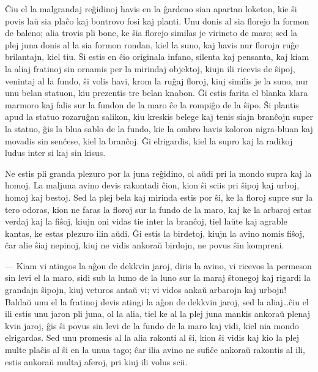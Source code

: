    \^Ciu el la malgrandaj re\^gidinoj havis en la \^gardeno sian apartan
loketon, kie \^si povis la\u u sia pla\^co kaj bontrovo fosi kaj
planti. Unu donis al sia florejo la formon de baleno; alia trovis
pli bone, ke \^sia florejo similas je virineto de maro; sed la plej
juna donis al la sia formon rondan, kiel la suno, kaj havis nur
florojn ru\^ge brilantajn, kiel tiu. \^Si estis en \^cio originala
infano, silenta kaj pensanta, kaj kiam la aliaj fratinoj sin ornamis
per la mirindaj objektoj, kiujn ili ricevis de \^sipoj, venintaj al
la fundo, \^si volis havi, krom la ru\^gaj floroj, kiuj similis je
la suno, nur unu belan statuon, kiu prezentis tre belan knabon. \^Gi
estis farita el blanka klara marmoro kaj falis sur la fundon de la
maro \^ce la rompi\^go de la \^sipo. \^Si plantis apud la statuo
rozaru\^gan salikon, kiu kreskis belege kaj tenis siajn bran\^cojn
super la statuo, \^gis la blua sablo de la fundo, kie la ombro havis
koloron nigra-bluan kaj movadis sin sen\^cese, kiel la bran\^coj.
\^Gi elrigardis, kiel la supro kaj la radikoj ludus inter si kaj sin
kisus.

   Ne estis pli granda plezuro por la juna re\^gidino, ol a\u udi pri la
mondo supra kaj la homoj. La maljuna avino devis rakontadi \^cion,
kion \^si sciis pri \^sipoj kaj urboj, homoj kaj bestoj. Sed la plej
bela kaj mirinda estis por \^si, ke la floroj supre sur la tero
odoras, kion ne faras la floroj sur la fundo de la maro, kaj ke la
arbaroj estas verdaj kaj la fi\^soj, kiujn oni vidas tie inter la
bran\^coj, tiel la\u ute kaj agrable kantas, ke estas plezuro ilin
a\u udi. \^Gi estis la birdetoj, kiujn la avino nomis fi\^soj, \^car
alie \^siaj nepinoj, kiuj ne vidis ankora\u u birdojn, ne povus
\^sin kompreni.

 --- Kiam vi atingos la a\^gon de dekkvin jaroj, diris la avino, vi
ricevos la permeson sin levi el la maro, sidi sub la lumo de la luno
sur la maraj \^stonegoj kaj rigardi la grandajn \^sipojn, kiuj
veturos anta\u u vi; vi vidos anka\u u arbarojn kaj urbojn! Balda\u
u unu el la fratinoj devis atingi la a\^gon de dekkvin jaroj, sed la
aliaj\dots \^ciu el ili estis unu jaron pli juna, ol la alia, tiel
ke al la plej juna mankis ankora\u u plenaj kvin jaroj, \^gis \^si
povus sin levi de la fundo de la maro kaj vidi, kiel nia mondo
elrigardas. Sed unu promesis al la alia rakonti al \^si, kion \^si
vidis kaj kio la plej multe pla\^cis al \^si en la unua tago; \^car
ilia avino ne sufi\^ce ankora\u u rakontis al ili, estis ankora\u u
multaj aferoj, pri kiuj ili volus scii.

